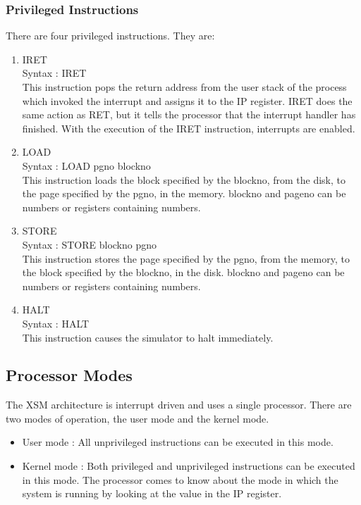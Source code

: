 \documentclass[11pt]{article}
\begin{document}
\subsubsection{Privileged Instructions}
There are four privileged instructions. They are:
\begin{enumerate}
\item IRET\\
Syntax : IRET\\
This instruction pops the return address from the user stack of the process which invoked the interrupt and assigns it to the IP register. IRET does the same action as RET, but it tells the processor that the interrupt handler has finished. With the execution of the IRET instruction, interrupts are enabled.
\item LOAD\\
Syntax : LOAD pg\textunderscore no block\textunderscore no\\
This instruction loads the block specified by the block\textunderscore no, from the disk, to the page specified by the pg\textunderscore no, in the memory. block\textunderscore no and page\textunderscore no can be numbers or registers containing numbers.
\item STORE\\
Syntax : STORE block\textunderscore no pg\textunderscore no\\ 
This instruction stores the page specified by the pg\textunderscore no, from the memory, to the block specified by the block\textunderscore no, in the disk. block\textunderscore no and page\textunderscore no can be numbers or registers containing numbers.
\item HALT\\
Syntax : HALT\\
This instruction causes the simulator to halt immediately.
\end{enumerate}

\subsection{Processor Modes}
The XSM architecture is interrupt driven and uses a single processor. There are two modes of operation, the user mode and the kernel mode.
\begin{itemize}
\item User mode : All unprivileged instructions can be executed in this mode.
\item Kernel mode : Both privileged and unprivileged instructions can be executed in this mode. The processor comes to know about the mode in which the system is running by looking at the value in the IP register.
\end{itemize}
\end{document}
